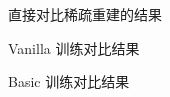 直接对比稀疏重建的结果

Vanilla 训练对比结果
\begin{table}
    
\end{table}

Basic 训练对比结果
\begin{table}
    
\end{table}
